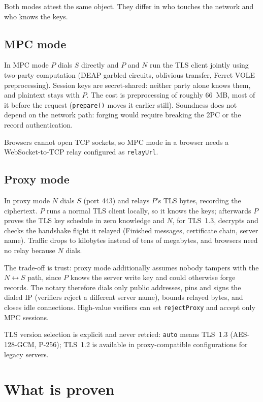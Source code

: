 \documentclass[11pt,a4paper]{article}
\begin{document}
Both modes attest the same object. They differ in who touches the network and
who knows the keys.

\subsection{MPC mode}

In MPC mode $P$ dials $S$ directly and $P$ and $N$ run the TLS client jointly
using two-party computation (DEAP garbled circuits, oblivious transfer, Ferret
VOLE preprocessing).
Session keys are secret-shared: neither party alone knows them, and plaintext
stays with $P$.
The cost is preprocessing of roughly 66~MB, most of it before the request
(\texttt{prepare()} moves it earlier still).
Soundness does not depend on the network path: forging would require breaking
the 2PC or the record authentication.

Browsers cannot open TCP sockets, so MPC mode in a browser needs a
WebSocket-to-TCP relay configured as \texttt{relayUrl}.

\subsection{Proxy mode}

In proxy mode $N$ dials $S$ (port 443) and relays $P$'s TLS bytes, recording
the ciphertext.
$P$ runs a normal TLS client locally, so it knows the keys; afterwards $P$
proves the TLS key schedule in zero knowledge and $N$, for TLS~1.3, decrypts
and checks the handshake flight it relayed (Finished messages, certificate
chain, server name).
Traffic drops to kilobytes instead of tens of megabytes, and browsers need no
relay because $N$ dials.

The trade-off is trust: proxy mode additionally assumes nobody tampers with
the $N \leftrightarrow S$ path, since $P$ knows the server write key and could
otherwise forge records.
The notary therefore dials only public addresses, pins and signs the dialed IP
(verifiers reject a different server name), bounds relayed bytes, and closes
idle connections.
High-value verifiers can set \texttt{rejectProxy} and accept only MPC sessions.

TLS version selection is explicit and never retried: \texttt{auto} means
TLS~1.3 (AES-128-GCM, P-256); TLS~1.2 is available in proxy-compatible
configurations for legacy servers.

\section{What is proven}
\end{document}
